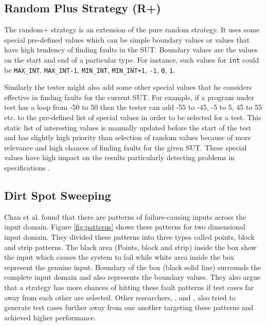 \documentclass[conference]{IEEEtran}
\begin{document}
\subsection{Random Plus Strategy (R+)}
The random+ strategy \cite{Leitner2007} is an extension of the pure random strategy. It uses some special pre-defined values which can be simple boundary values or values that have high tendency of finding faults in the SUT. Boundary values \cite{Beizer1990} are the values on the start and end of a particular type. For instance, such values for \verb+int+ could be \verb+MAX_INT+, \verb+MAX_INT-1+, \verb+MIN_INT+, \verb-MIN_INT+1-, \verb+-1+, \verb+0+, \verb+1+.


%

Similarly the tester might also add some other special values that he considers effective in finding faults for the current SUT. For example, if a program under test has a loop from -50 to 50 then the tester can add -55 to -45, -5 to 5, 45 to 55 etc. to the pre-defined list of special values in order to be selected for a test. This static list of interesting values is manually updated before the start of the test and has slightly high priority than selection of random values because of more relevance and high chances of finding faults for the given SUT. These special values have high impact on the results particularly detecting problems in specifications \cite{Ciupa2008}.


\subsection{Dirt Spot Sweeping}
Chan et al. \cite{Chan1996} found that there are patterns of failure-causing inputs across the input domain. Figure \ref{fig:patterns} shows these patterns for two dimensional input domain. They divided these patterns into three types called points, block and strip patterns. The black area (Points, block and strip) inside the box show the input which causes the system to fail while white area inside the box represent the genuine input. Boundary of the box (black solid line) surrounds the complete input domain and also represents the boundary values. They also argue that a strategy has more chances of hitting these fault patterns if test cases far away from each other are selected. Other researchers, \cite{Chan2002}, \cite{Chen2003} and \cite{Chen2005}, also tried to generate test cases further away from one another targeting these patterns and achieved higher performance.
\end{document}
